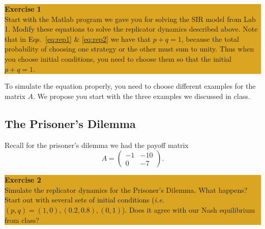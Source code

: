 \documentclass[12pt]{amsart}
\begin{document}
\bigskip
\begin{center}
\colorbox{Goldenrod}{\parbox{15cm}{
{
\textbf{\large Exercise 1}\vspace{1mm} \\
Start with the Matlab program we gave you for solving the SIR model from Lab 1.
Modify these equations to solve the replicator dynamics described above.
Note that in Eqs.~\ref{eq:rep1} \& \ref{eq:rep2} we have that $p+q=1$, because
the total probability of choosing one strategy or the other must sum to unity.
Thus when you choose initial conditions, you need to choose them so that the
initial $p+q=1$. }}}
\end{center}
\bigskip 

\noindent To simulate the equation properly, you need to choose different examples for
the matrix $A$. We propose you start with the three examples we discussed in
class.

%

\subsection{The Prisoner's Dilemma}
\noindent Recall for the prisoner's dilemma we had the payoff matrix
\[
A=\left( \begin{array}{cc}
-1 & -10 \\
0 & -7 \end{array} \right).
\]


\bigskip
\begin{center}
\colorbox{Goldenrod}{\parbox{15cm}{
{
\textbf{\large Exercise 2}\vspace{1mm} \\
Simulate the replicator dynamics for the Prisoner's Dilemma.  What
happens? Start out with several sets of initial conditions ({\it i.e.}
$(p,q)=(1,0), (0.2,0.8), (0,1)$). Does it agree with our Nash equilibrium from
class?}}}
\end{center}
\end{document}
